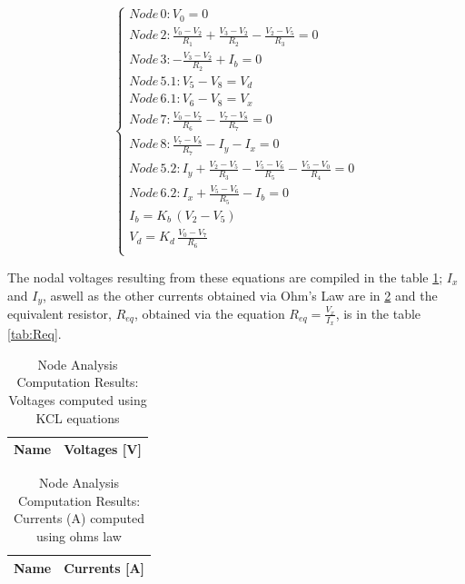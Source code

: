 \begin{equation} 
\begin{cases}

    Node\, 0: V_0 = 0 \\
    Node\, 2: \frac{V_0 - V_2}{R_1} + \frac{V_3 - V_2}{R_2} - \frac{V_2 - V_5}{R_3} = 0 \\
    Node\, 3: -\frac{V_3 - V_2}{R_2} + I_b = 0 \\
    Node\, 5.1: V_5 - V_8 = V_d \\
    Node\, 6.1: V_6 - V_8 = V_x \\
    Node\, 7: \frac{V_0 - V_7}{R_6} - \frac{V_7 - V_8}{R_7} = 0 \\
    Node\, 8: \frac{V_7 - V_8}{R_7} - I_y - I_x = 0 \\
    Node\, 5.2: I_y + \frac{V_2 - V_5}{R_3} - \frac{V_5 - V_6}{R_5} - \frac{V_5 - V_0}{R_4} = 0 \\
    Node\, 6.2: I_x + \frac{V_5 - V_6}{R_5} - I_b = 0 \\
    I_b = K_b\,(V_2 - V_5) \\
    V_d = K_d\,\frac{V_0 - V_7}{R_6}\\
    
\end{cases}
\label{eq:2}
\end{equation}

The nodal voltages resulting from these equations are compiled in the table \ref{tab:nodeVoltages2}; $I_x$ and $I_y$, aswell as the other currents obtained via
Ohm's Law are in \ref{tab:nodeCurrents2} and the equivalent resistor, $R_{eq}$, obtained via the equation $R_{eq} = \frac{V_x}{I_x}$, is in the table \ref{tab:Req}.

\begin{table}[h]
  \centering
  \begin{tabular}{|l|r|}
    \hline    
    {\bf Name} & {\bf Voltages [V]} \\ \hline
    
  \end{tabular}
  \caption{Node Analysis Computation Results: Voltages computed using KCL equations}
  \label{tab:nodeVoltages2}
\end{table}


\begin{table}[h]
  \centering
  \begin{tabular}{|l|r|}
    \hline    
    {\bf Name} & {\bf Currents [A]} \\ \hline
    
  \end{tabular}
  \caption{Node Analysis Computation Results: Currents (A) computed using ohms law}
  \label{tab:nodeCurrents2}
\end{table}

